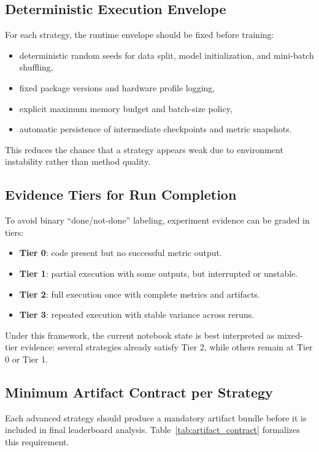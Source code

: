 \documentclass[10pt,journal]{IEEEtran}
\begin{document}
\subsection{Deterministic Execution Envelope}
For each strategy, the runtime envelope should be fixed before training:
\begin{itemize}
\item deterministic random seeds for data split, model initialization, and mini-batch shuffling,
\item fixed package versions and hardware profile logging,
\item explicit maximum memory budget and batch-size policy,
\item automatic persistence of intermediate checkpoints and metric snapshots.
\end{itemize}

This reduces the chance that a strategy appears weak due to environment instability rather than method quality.

\subsection{Evidence Tiers for Run Completion}
To avoid binary ``done/not-done'' labeling, experiment evidence can be graded in tiers:
\begin{itemize}
\item \textbf{Tier 0}: code present but no successful metric output.
\item \textbf{Tier 1}: partial execution with some outputs, but interrupted or unstable.
\item \textbf{Tier 2}: full execution once with complete metrics and artifacts.
\item \textbf{Tier 3}: repeated execution with stable variance across reruns.
\end{itemize}

Under this framework, the current notebook state is best interpreted as mixed-tier evidence: several strategies already satisfy Tier 2, while others remain at Tier 0 or Tier 1.

\subsection{Minimum Artifact Contract per Strategy}
Each advanced strategy should produce a mandatory artifact bundle before it is included in final leaderboard analysis. Table~\ref{tab:artifact_contract} formalizes this requirement.
\end{document}

